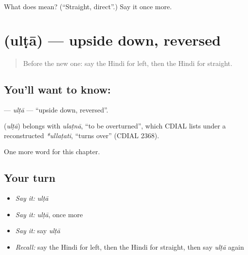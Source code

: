 \begin{tcolorbox}[breakable,colback=teal!4,colframe=teal!35!black,title={Before you move on}]
What does  mean? (\textquotedblleft{}Straight, direct\textquotedblright{}.) Say it once more.
\end{tcolorbox}
\section[\texorpdfstring{\hi{उल्टा} (ulṭā)}{उल्टा (ulṭā)}]{ (ulṭā) — upside down, reversed}

\label{lesson:HI-C234-ulta}



\begin{quote}
Before the new one: say the Hindi for left, then the Hindi for straight.
\end{quote}

\subsection*{You'll want to know: }
\textbf{} — \emph{ulṭā} — \textquotedblleft{}upside down, reversed\textquotedblright{}.

\begin{cousinweb}
\textbf{} (\emph{ulṭā}) belongs with \emph{ulaṭnā}, \textquotedblleft{}to be overturned\textquotedblright{}, which CDIAL lists under a reconstructed \emph{*ullaṭati}, \textquotedblleft{}turns over\textquotedblright{} (CDIAL 2368).
\end{cousinweb}

\begin{grammarlens}[title={What you've built}]
One more word for this chapter.
\end{grammarlens}

\subsection*{Your turn}
\begin{itemize}
\raggedright
  \item \emph{Say it:} \emph{ulṭā}
  \item \emph{Say it:} \emph{ulṭā}, once more
  \item \emph{Say it:} say \emph{ulṭā}
  \item \emph{Recall:} say the Hindi for left, then the Hindi for straight, then say \emph{ulṭā} again
\end{itemize}

